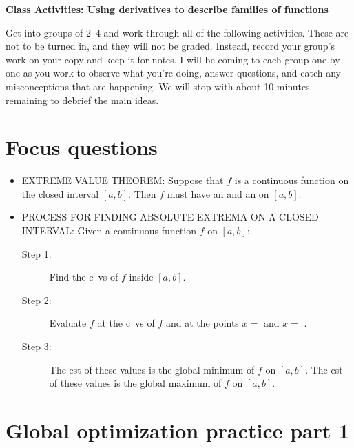 \documentclass[11pt]{article}
\def\blank{\underline{\hspace{1in}}}
\begin{document}
	
	\thispagestyle{empty}
	\renewcommand{\headrulewidth}{0.0pt}
	\thispagestyle{fancy}
	\lfoot{}
	\cfoot{}
	\rfoot{}	
	
	\vspace*{0in}

		\begin{center}
			\begin{large}
			\textbf{Class Activities: Using derivatives to describe families of functions} \\
			\end{large}
		\end{center}
	
Get into groups of 2--4 and work through all of the following activities. These are not to be turned in, and they will not be graded. Instead, record your group's work on your copy and keep it for notes. I will be coming to each group one by one as you work to observe what you're doing, answer questions, and catch any misconceptions that are happening. We will stop with about 10 minutes remaining to debrief the main ideas.

\section{Focus questions}

\begin{itemize}
	\item EXTREME VALUE THEOREM: Suppose that $f$ is a continuous function on the closed interval $[a,b]$. Then $f$ must have an \blank \blank and an \blank \blank on $[a,b]$. 
	\item PROCESS FOR FINDING ABSOLUTE EXTREMA ON A CLOSED INTERVAL: Given a continuous function $f$ on $[a,b]$: 
	\begin{description}
		\item[Step 1:] Find the c\blank \ v\blank s of $f$ inside $[a,b]$. 
		\item[Step 2:] Evaluate $f$ at the c\blank \ v\blank s of $f$ and at the points $x=$ \blank 
	and $x=$ \blank. 
		\item[Step 3:] The \blank est  of these values is the global minimum of $f$ on $[a,b]$. The  \blank est  of these values is the global maximum of $f$ on $[a,b]$.
	\end{description}
\end{itemize}


\section{Global optimization practice part 1} 
\end{document}

